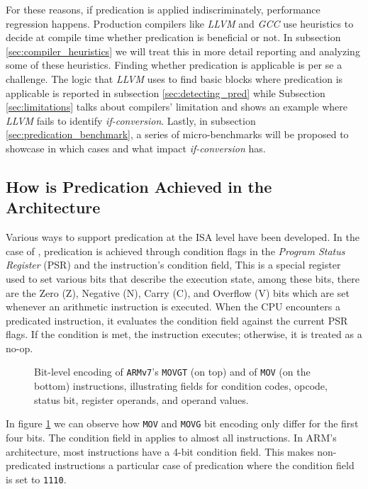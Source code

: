 For these reasons, if predication is applied indiscriminately, performance regression happens. Production compilers like \textit{LLVM} and \textit{GCC} use heuristics to decide at compile time whether predication is beneficial or not. In subsection \ref{sec:compiler_heuristics} we will treat this in more detail reporting and analyzing some of these heuristics. Finding whether predication is applicable is per se a challenge. The logic that \textit{LLVM} uses to find basic blocks where predication is applicable is reported in subsection \ref{sec:detecting_pred} while Subsection \ref{sec:limitations} talks about compilers' limitation and shows an example where \textit{LLVM} fails to identify \textit{if-conversion}. Lastly, in subsection \ref{sec:predication_benchmark}, a series of micro-benchmarks will be proposed to showcase in which cases and what impact \textit{if-conversion} has.

\subsection{How is Predication Achieved in the Architecture}
\label{sec:arch_support}
Various ways to support predication at the ISA level have been developed. In the case of \armvs, predication is achieved through condition flags in the \textit{Program Status Register} (PSR) and the instruction’s condition field,
This is a special register used to set various bits that describe the execution state, among these bits, there are the Zero (Z), Negative (N), Carry (C), and Overflow (V) bits which are set whenever an arithmetic instruction is executed.
When the CPU encounters a predicated instruction, it evaluates the condition field against the current PSR flags. If the condition is met, the instruction executes; otherwise, it is treated as a no-op.

\begin{figure}[H]
    \centering
    
    
    \caption[\texttt{ARMv7}'s Bit-level Encoding]{Bit-level encoding of \texttt{ARMv7}'s \texttt{MOVGT} (on top) and of \texttt{MOV} (on the bottom) instructions, illustrating fields for condition codes, opcode, status bit, register operands, and operand values.}
    \label{fig:mov_encoding}
\end{figure}

In figure \ref{fig:mov_encoding} we can observe how \texttt{MOV} and \texttt{MOVG} bit encoding only differ for the first four bits. The condition field in \armvs applies to almost all instructions. In ARM's architecture, most instructions have a 4-bit condition field. This makes non-predicated instructions a particular case of predication where the condition field is set to \texttt{1110}. \\


